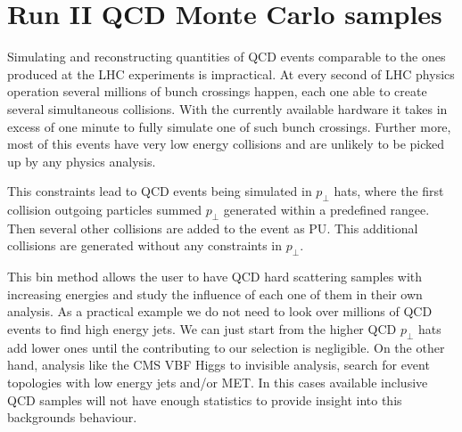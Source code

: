 % 
% 
% 
% 

\section{Run II QCD Monte Carlo samples}
\label{SECTION:RunIIPreparation_RunIIQCDMonteCarloSamples}


Simulating and reconstructing quantities of \gls{QCD} events comparable to the ones produced at the \gls{LHC} experiments is impractical. At every second of \gls{LHC} physics operation several millions of bunch crossings happen, each one able to create several simultaneous collisions. With the currently available hardware it takes in excess of one minute to fully simulate one of such bunch crossings. Further more, most of this events have very low energy collisions and are unlikely to be picked up by any physics analysis.  

This constraints lead to \gls{QCD} events being simulated in $p_\perp$ hats, where the first collision outgoing particles summed $p_\perp$ generated within a predefined rangee. Then several other collisions are added to the event as \gls{PU}. This additional collisions are generated without any constraints in $p_\perp$. 

This bin method allows the user to have \gls{QCD} hard scattering samples with increasing energies and study the influence of each one of them in their own analysis. As a practical example we do not need to look over millions of \gls{QCD} events to find high energy jets. We can just start from the higher \gls{QCD} $p_\perp$ hats add lower ones until the contributing to our selection is negligible. On the other hand, analysis like the \gls{CMS} \gls{VBF} Higgs to invisible analysis, search for event topologies with low energy jets and/or \gls{MET}. In this cases available inclusive \gls{QCD} samples will not have enough statistics to provide insight into this backgrounds behaviour. 

